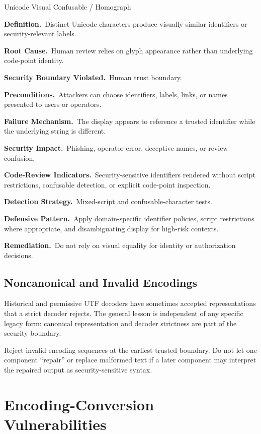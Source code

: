 \documentclass[11pt]{article}
\newcommand{\field}[1]{\par\smallskip\noindent\textbf{#1.}\ }
\begin{document}
\begin{catalogbox}{Unicode Visual Confusable / Homograph}
\field{Definition}Distinct Unicode characters produce visually similar identifiers or security-relevant labels.

\field{Root Cause}Human review relies on glyph appearance rather than underlying code-point identity.

\field{Security Boundary Violated}Human trust boundary.

\field{Preconditions}Attackers can choose identifiers, labels, links, or names presented to users or operators.

\field{Failure Mechanism}The display appears to reference a trusted identifier while the underlying string is different.

\field{Security Impact}Phishing, operator error, deceptive names, or review confusion.

\field{Code-Review Indicators}Security-sensitive identifiers rendered without script restrictions, confusable detection, or explicit code-point inspection.

\field{Detection Strategy}Mixed-script and confusable-character tests.

\field{Defensive Pattern}Apply domain-specific identifier policies, script restrictions where appropriate, and disambiguating display for high-risk contexts.

\field{Remediation}Do not rely on visual equality for identity or authorization decisions.
\end{catalogbox}

\subsection{Noncanonical and Invalid Encodings}

Historical and permissive UTF decoders have sometimes accepted representations that a strict decoder rejects. The general lesson is independent of any specific legacy form: canonical representation and decoder strictness are part of the security boundary.

\begin{securityprinciple}
Reject invalid encoding sequences at the earliest trusted boundary. Do not let one component ``repair'' or replace malformed text if a later component may interpret the repaired output as security-sensitive syntax.
\end{securityprinciple}
\clearpage

\section{Encoding-Conversion Vulnerabilities}
\end{document}
